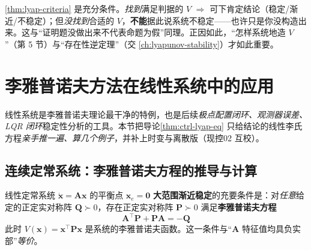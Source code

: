 \begin{pitfall}
\cref{thm:lyap-criteria} 是充分条件。\emph{找到}满足判据的 $V$ $\Rightarrow$ 可下肯定结论（稳定/渐近/不稳定）；但\emph{没找到}合适的 $V$，\textbf{不能}据此说系统不稳定——也许只是你没构造出来。这与“证明题没做出来不代表命题为假”同理。正因如此，“怎样系统地造 $V$”（第 5 节）与“存在性逆定理”（交 \cref{ch:lyapunov-stability}）才如此重要。
\end{pitfall}

\section{李雅普诺夫方法在线性系统中的应用}
\label{sec:lyap-linear-app}

线性系统是李雅普诺夫理论最干净的特例，也是后续\emph{极点配置闭环、观测器误差、LQR 闭环}稳定性分析的工具。本节把导论\cref{thm:ctrl-lyap-eq} 只给结论的线性李氏方程\emph{亲手推一遍、算几个例子}，并补上时变与离散版（现控02 互校）。

\subsection{连续定常系统：李雅普诺夫方程的推导与计算}
\label{sec:lyap-eq-cont}

\begin{theorem}[线性定常系统渐近稳定判据]\label{thm:lyap-eq-cont}
线性定常系统 $\dot{\mathbf{x}}=\mathbf{A}\mathbf{x}$ 的平衡点 $\mathbf{x}_e=\mathbf{0}$ \textbf{大范围渐近稳定}的充要条件是：对\emph{任意}给定的正定实对称阵 $\mathbf{Q}\succ0$，存在正定实对称阵 $\mathbf{P}\succ0$ 满足\textbf{李雅普诺夫方程}
\begin{equation}
  \boxed{\ \mathbf{A}^\top\mathbf{P}+\mathbf{P}\mathbf{A}=-\mathbf{Q}\ }
  \label{eq:lyap-eq}
\end{equation}
此时 $V(\mathbf{x})=\mathbf{x}^\top\mathbf{P}\mathbf{x}$ 是系统的李雅普诺夫函数。这一条件与“$\mathbf{A}$ 特征值均具负实部”\emph{等价}。
\end{theorem}

